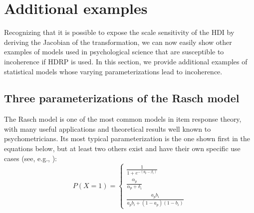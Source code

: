 \documentclass[man]{apa}
\newcommand{\hdr}{HDRP}
\begin{document}




\section*{Additional examples}

Recognizing that it is possible to expose the scale sensitivity of the HDI by deriving the Jacobian of the transformation, we can now easily show other examples of models used in psychological science that are susceptible to incoherence if \hdr{} is used.  In this section, we provide  additional examples of statistical models whose varying parameterizations lead to incoherence.

\subsection*{Three parameterizations of the Rasch model}

The Rasch model \cite{Rasch1960} is one of the most common models in item response theory, with many useful applications and theoretical results well known to psychometricians.  Its most typical parameterization is the one shown first in the equations below, but at least two others exist and have their own specific use cases (see, e.g., ):
\begin{equation*}
    P(X = 1) =
    \begin{cases}
    \frac{1}{1+e^{-(\theta_p-\beta_i)}}  \\
    \frac{\alpha_p}{\alpha_p + \delta_i} \\ 
    \frac{a_p b_i}{a_pb_i+(1-a_p)(1-b_i)} 
    \end{cases}
\end{equation*}
\end{document}
